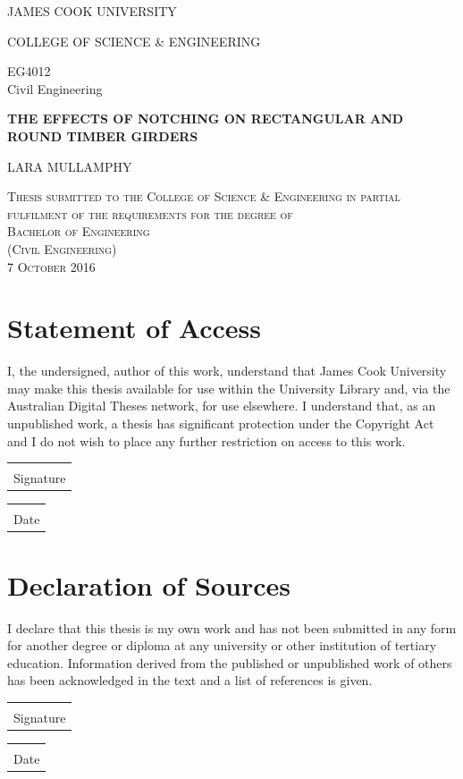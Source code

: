 \documentclass[11pt,a4paper]{article}
\makeatletter
\newcommand{\titledate}[2][2.5in]{%
	\noindent%
	\begin{tabular}{@{}p{#1}@{}}
		\\ \hline \\[-.75\normalbaselineskip]
		#2
	\end{tabular} \hspace{1in}
	\begin{tabular}{@{}p{#1}@{}}
		\\ \hline \\[-.75\normalbaselineskip]
		Date
	\end{tabular}
}
\numberwithin{equation}{subsection}
\newcommand*{\titleGP}{\begingroup %
	\centering %
	\vspace*{\baselineskip} %
	
	
	{\Large JAMES COOK UNIVERSITY\\ [0.3\baselineskip] } %
	
	{\Huge COLLEGE OF SCIENCE \&{} ENGINEERING\\ [0.3\baselineskip] } %
	
	\vspace*{7\baselineskip} %
	
	{\Huge EG4012\\ Civil Engineering\\ [0.3\baselineskip] } %
	
	\vspace*{6\baselineskip} %
	
	{\Huge \bf{THE EFFECTS OF NOTCHING ON RECTANGULAR AND ROUND TIMBER GIRDERS}\\ [0.3\baselineskip] } %
	
	\vspace*{2\baselineskip} %
	
	{\LARGE LARA MULLAMPHY\par} %

	
	\vfill %
	
	
		\scshape %
		Thesis submitted to the College of Science \& Engineering in partial fulfilment of the requirements for the degree of \\
		{\Large Bachelor of Engineering\\ (Civil Engineering)} %
		\\[\baselineskip] %
		7 October 2016\par %
	
	\endgroup}
\makeatother
\begin{document}
	\titleGP %

	
	\pagestyle{fancy}
	\fancyhead{}
	\fancyfoot{}
	\renewcommand{\headrulewidth}{0pt}
	\fancyfoot[R]{\thepage}
	\pagebreak
	\section*{Statement of Access}

I, the undersigned, author of this work, understand that James Cook University may make this thesis available for use within the University Library and, via the Australian Digital Theses network, for use elsewhere. I understand that, as an unpublished work, a thesis has significant protection under the Copyright Act and I do not wish to place any further restriction on access to this work. 

	\vspace*{\baselineskip}
	
	\vspace*{\baselineskip}
	
\titledate[2.3in]{Signature}
\pagebreak


	\section*{Declaration of Sources} 
I declare that this thesis is my own work and has not been submitted in any form for another degree or diploma at any university or other institution of tertiary education. Information derived from the published or unpublished work of others has been acknowledged in the text and a list of references is given. 

	\vspace*{\baselineskip}
	
	\vspace*{\baselineskip}
	
	\titledate[2.3in]{Signature}
\pagebreak

\end{document}
